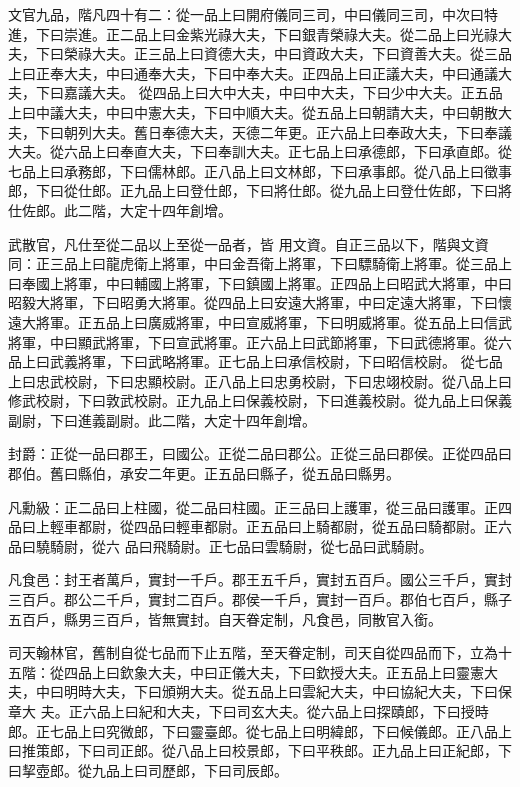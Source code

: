 \begin{pinyinscope}
 文官九品，階凡四十有二：從一品上曰開府儀同三司，中曰儀同三司，中次曰特進，下曰崇進。正二品上曰金紫光祿大夫，下曰銀青榮祿大夫。從二品上曰光祿大夫，下曰榮祿大夫。正三品上曰資德大夫，中曰資政大夫，下曰資善大夫。從三品上曰正奉大夫，中曰通奉大夫，下曰中奉大夫。正四品上曰正議大夫，中曰通議大夫，下曰嘉議大夫。
 從四品上曰大中大夫，中曰中大夫，下曰少中大夫。正五品上曰中議大夫，中曰中憲大夫，下曰中順大夫。從五品上曰朝請大夫，中曰朝散大夫，下曰朝列大夫。舊日奉德大夫，天德二年更。正六品上曰奉政大夫，下曰奉議大夫。從六品上曰奉直大夫，下曰奉訓大夫。正七品上曰承德郎，下曰承直郎。從七品上曰承務郎，下曰儒林郎。正八品上曰文林郎，下曰承事郎。從八品上曰徵事郎，下曰從仕郎。正九品上曰登仕郎，下曰將仕郎。從九品上曰登仕佐郎，下曰將仕佐郎。此二階，大定十四年創增。



 武散官，凡仕至從二品以上至從一品者，皆
 用文資。自正三品以下，階與文資同：正三品上曰龍虎衛上將軍，中曰金吾衛上將軍，下曰驃騎衛上將軍。從三品上曰奉國上將軍，中曰輔國上將軍，下曰鎮國上將軍。正四品上曰昭武大將軍，中曰昭毅大將軍，下曰昭勇大將軍。從四品上曰安遠大將軍，中曰定遠大將軍，下曰懷遠大將軍。正五品上曰廣威將軍，中曰宣威將軍，下曰明威將軍。從五品上曰信武將軍，中曰顯武將軍，下曰宣武將軍。正六品上曰武節將軍，下曰武德將軍。從六品上曰武義將軍，下曰武略將軍。正七品上曰承信校尉，下曰昭信校尉。
 從七品上曰忠武校尉，下曰忠顯校尉。正八品上曰忠勇校尉，下曰忠翊校尉。從八品上曰修武校尉，下曰敦武校尉。正九品上曰保義校尉，下曰進義校尉。從九品上曰保義副尉，下曰進義副尉。此二階，大定十四年創增。



 封爵：正從一品曰郡王，曰國公。正從二品曰郡公。正從三品曰郡侯。正從四品曰郡伯。舊曰縣伯，承安二年更。正五品曰縣子，從五品曰縣男。



 凡勳級：正二品曰上柱國，從二品曰柱國。正三品曰上護軍，從三品曰護軍。正四品曰上輕車都尉，從四品曰輕車都尉。正五品曰上騎都尉，從五品曰騎都尉。正六品曰驍騎尉，從六
 品曰飛騎尉。正七品曰雲騎尉，從七品曰武騎尉。



 凡食邑：封王者萬戶，實封一千戶。郡王五千戶，實封五百戶。國公三千戶，實封三百戶。郡公二千戶，實封二百戶。郡侯一千戶，實封一百戶。郡伯七百戶，縣子五百戶，縣男三百戶，皆無實封。自天眷定制，凡食邑，同散官入銜。



 司天翰林官，舊制自從七品而下止五階，至天眷定制，司天自從四品而下，立為十五階：從四品上曰欽象大夫，中曰正儀大夫，下曰欽授大夫。正五品上曰靈憲大夫，中曰明時大夫，下曰頒朔大夫。從五品上曰雲紀大夫，中曰協紀大夫，下曰保章大
 夫。正六品上曰紀和大夫，下曰司玄大夫。從六品上曰探賾郎，下曰授時郎。正七品上曰究微郎，下曰靈臺郎。從七品上曰明緯郎，下曰候儀郎。正八品上曰推策郎，下曰司正郎。從八品上曰校景郎，下曰平秩郎。正九品上曰正紀郎，下曰挈壺郎。從九品上曰司歷郎，下曰司辰郎。




\end{pinyinscope}

